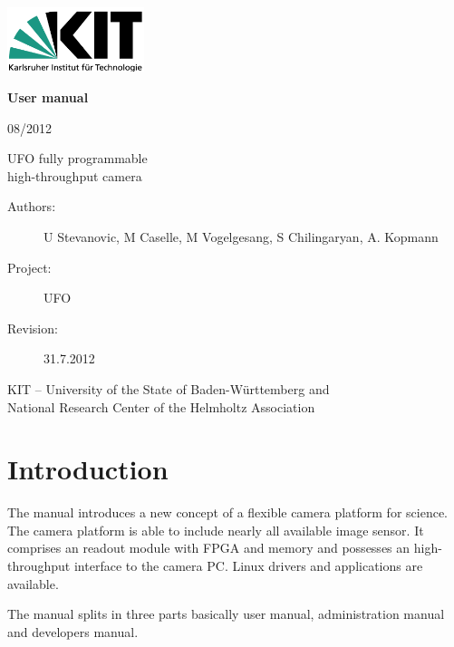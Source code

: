 \documentclass[12pt,a4paper,twoside]{book}
\begin{document}
\begin{titlepage}
\includegraphics[width=4cm]{images/kit_logo.png}


\hspace{4cm}
\begin{minipage}{12cm}
\vspace{3cm}
{\LARGE\bf User manual}

\vspace{0.2cm}
08/2012

\vspace{2.5cm}
{\LARGE UFO fully programmable\\[0.7ex]
 high-throughput camera}

\end{minipage}

\vfill
\hspace{4cm}
\begin{minipage}{12cm}
\begin{description}
\item[\textnormal{Authors:}] U Stevanovic, M Caselle, M Vogelgesang, S Chilingaryan, A. Kopmann
\item[\textnormal{Project:}] UFO 
\item[\textnormal{Revision:}] 31.7.2012 
\end{description}

\vspace{3cm}
KIT -- University of the State of Baden-Württemberg and\\
National Research Center of the Helmholtz Association
\end{minipage}
\end{titlepage}

\tableofcontents


\chapter*{Introduction}


The manual introduces a new concept of a flexible camera platform for science. The camera platform is able
to include nearly all available image sensor. It comprises an readout module with FPGA and memory and 
possesses an high-throughput interface to the camera PC. Linux drivers and applications are available.

The manual splits in three parts basically user manual, administration manual and developers manual.
\end{document}
